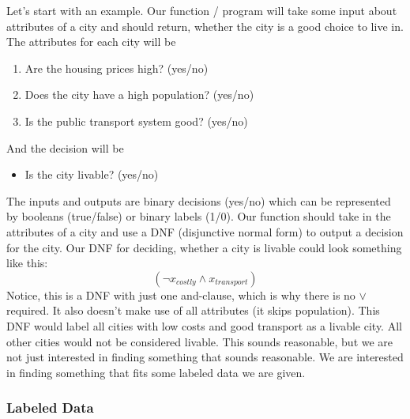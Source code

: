 \documentclass{article}
\begin{document}
Let's start with an example. Our function / program will take some input about attributes of a city and should return, whether the city is a good choice to live in.
The attributes for each city will be
\begin{enumerate}
\item Are the housing prices high? (yes/no)
\item Does the city have a high population? (yes/no)
\item Is the public transport system good? (yes/no)
\end{enumerate}
And the decision will be
\begin{itemize}
\item Is the city livable? (yes/no)
\end{itemize}
The inputs and outputs are binary decisions (yes/no) which can be represented by booleans (true/false) or binary labels (1/0).
Our function should take in the attributes of a city and use a DNF (disjunctive normal form) to output a decision for the city.
Our DNF for deciding, whether a city is livable could look something like this:
\begin{equation*}
    (\lnot x_{costly} \land x_{transport})
\end{equation*}
Notice, this is a DNF with just one and-clause, which is why there is no $\lor$ required.
It also doesn't make use of all attributes (it skips population).
This DNF would label all cities with low costs and good transport as a livable city. All other cities would not be considered livable. This sounds reasonable, but we are not just interested in finding something that sounds reasonable. We are interested in finding something that fits some labeled data we are given.

\subsubsection{Labeled Data}
\end{document}

